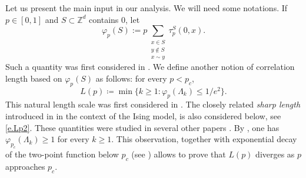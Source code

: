 \documentclass[11pt,a4paper]{article}
\numberwithin{equation}{section}
\theoremstyle{plain}
\theoremstyle{definition}
\newcommand{\1}{\mathbf 1}
\begin{document}
Let us present the main input in our analysis. We will need some notations. 
If $p\in [0,1]$ and $S\subset \mathbb Z^d$ contains $0$, let
	\begin{equation}
		\varphi_p(S):=p\sum_{\substack{x\in S\\y\notin S\\x\sim y}}\tau^{S}_p(0,x).
	\end{equation}
	Such a quantity was first considered in \cite{DuminilTassionNewProofSharpness2016}. We define another notion of correlation length based on $\varphi_p(S)$ as follows: for every $p<p_c$,
	\begin{equation}\label{e.Lp}
	L(p)\coloneqq \min \{k\geq1: \varphi_p(\Lambda_k)\leq 1/e^2\}.
	\end{equation}
	This natural length scale was first considered in \cite[Section~4]{hutchcroft2022derivation}. The closely related \emph{sharp length} introduced in \cite{PanisTriviality2023} in the context of the Ising model, is also considered below, see \eqref{e.Lp2}. These quantities were studied in several other papers \cite{PanisTriviality2023,DuminilPanis2024newLB,DumPan24WSAW,vEGPS}. By \cite{DuminilTassionNewProofSharpness2016}, one has $\varphi_{p_c}(\Lambda_k)\geq 1$ for every $k\geq 1$. This observation, together with exponential decay of the two-point function below $p_c$ (see \cite{Mensikov1986coincidence,AizenmanBarsky1987sharpnessPerco,DuminilTassionNewProofSharpness2016}) allows to prove that $L(p)$ diverges as $p$ approaches $p_c$.
	
\end{document}
